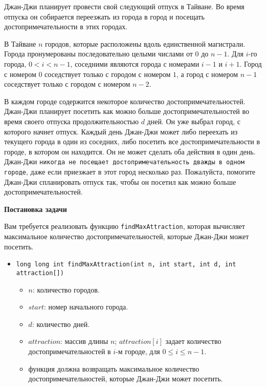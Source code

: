 Джан-Джи планирует провести свой следующий отпуск в Тайване. Во время отпуска он
собирается переезжать из города в город и посещать достопримечательности в этих городах.

В Тайване $n$ городов, которые расположены вдоль единственной магистрали. Города
пронумерованы последовательно целыми числами от $0$ до $n - 1$. Для $i$-го города, $0 < i < n - 1$, соседними являются города с номерами $i - 1$ и $i + 1$. Город с номером $0$
соседствует только с городом с номером $1$, а город с номером $n - 1$ соседствует только с
городом с номером $n - 2$.

В каждом городе содержится некоторое количество достопримечательностей. Джан-Джи
планирует посетить как можно больше достопримечательностей во время своего отпуска
продолжительностью $d$ дней. Он уже выбрал город, с которого начнет отпуск. Каждый день
Джан-Джи может либо переехать из текущего города в один из соседних, либо посетить все
достопримечательности в городе, в котором он находится. Он не может сделать оба действия
в один день. Джан-Джи \texttt{никогда не посещает достопримечательность дважды в одном
городе}, даже если приезжает в этот город несколько раз. Пожалуйста, помогите Джан-Джи
спланировать отпуск так, чтобы он посетил как можно больше достопримечательностей.

\textbf{Постановка задачи}

Вам требуется реализовать функцию \texttt{findMaxAttraction}, которая вычисляет максимальное количество достопримечательностей, которые Джан-Джи может посетить.

\begin{itemize}
\item \texttt{long long int findMaxAttraction(int n, int start, int d,
int attraction[])}
\begin{itemize}
\item $n$: количество городов.
\item $start$: номер начального города.
\item $d$: количество дней.
\item $attraction$: массив длины $n$; $attraction[i]$ задает количество
достопримечательностей в $i$-м городе, для $0 \le i \le n - 1$.
\item функция должна возвращать максимальное количество достопримечательностей,
которые Джан-Джи может посетить.
\end{itemize}
\end{itemize}
